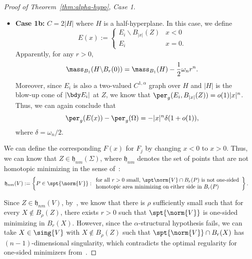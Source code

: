 \begin{proof}[Proof of Theorem~\ref{thm:alpha-hypo}, Case 1]
\begin{itemize}
    \item \textbf{Case 1b:} $C = 2|H|$ where $H$ is a half-hyperplane. In this case, we define
    \begin{equation}
        E(x) := \begin{cases}
            E_i\backslash B_{|x|}(Z) & x < 0\\
            E_i & x= 0.
        \end{cases}
    \end{equation}
    Apparently, for any $r > 0$,
    \begin{equation}
        \mass_{B_1}(H\backslash B_r(0)) = \mass_{B_1}(H) - \frac{1}{2}\omega_n r^n.
    \end{equation}
    Moreover, since $E_i$ is also a two-valued $C^{1, \alpha}$ graph over $H$ and $|H|$ is the blow-up cone of
    $|\bdy E_i|$ at $Z$, we know that $\per_g(E_i, B_{|x|}(Z)) = o(1)|x|^n$. Thus, we can again conclude that
    \begin{equation}
        \per_g(E(x)) - \per_g(\Omega) = -|x|^n\delta(1 + o(1)),
    \end{equation}
    where $\delta = \omega_n/2$.
\end{itemize}

We can define the corresponding $F(x)$ for $F_j$ by changing $x < 0$ to $x > 0$. Thus, we can know that
$Z \in \mathfrak{h}_{nm}(\Sigma)$, where $\mathfrak{h}_{nm}$ denotes the set of points that are not homotopic minimizing
in the sense of~\cite{CLS22}:
\begin{equation}
    \mathfrak{h}_{nm}(V) :=
  \left\{P \in \spt{\norm{V}}: \begin{array}{l}
      \text{for all $r > 0$ small, $\spt\norm{V}\cap B_r(P)$ is not one-sided}\\
      \text{homotopic area minimizing on either side in $B_r(P)$}
  \end{array}\right\}.
\end{equation}

Since $Z \in \mathfrak{h}_{nm}(V)$, by~\cite[Proposition 3.1]{CLS22}, we know that there is $\rho$ sufficiently small
such that for every $X \notin B_\rho(Z)$, there exists $r > 0$ such that $\spt{\norm{V}}$ is one-sided minimizing in
$B_r(X)$. However, since the $\alpha$-structural hypothesis fails, we can take $X \in \sing{V}$ with $X \notin B_\rho(Z)$
such that $\spt{\norm{V}}\cap B_r(X)$ has $(n - 1)$-dimensional singularity, which contradicts the optimal regularity
for one-sided minimizers from~\cite{Liu19}.


\end{proof}
